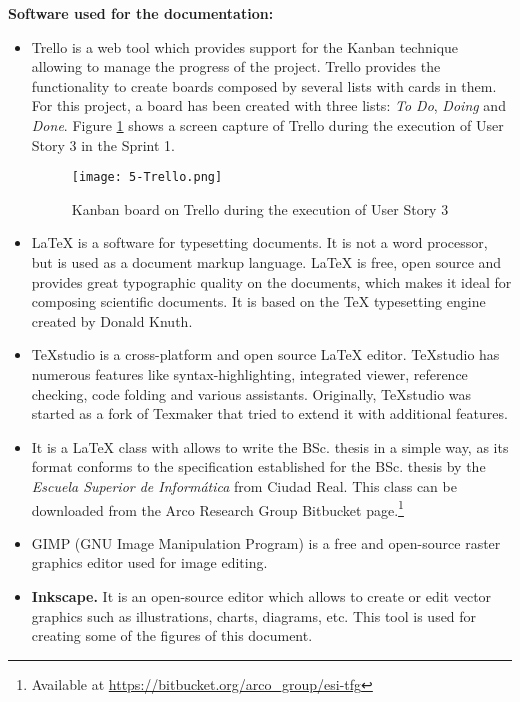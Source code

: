 \textbf{Software used for the documentation:}
\begin{itemize}
	\item {} Trello is a web tool which provides support for the Kanban technique allowing to manage the progress of the project. Trello provides the functionality to create boards composed by several lists with cards in them. For this project, a board has been created with three lists: \emph{To Do}, \emph{Doing} and \emph{Done}. Figure \ref{fig:5-Trello} shows a screen capture of Trello during the execution of User Story 3 in the Sprint 1.
	
	\begin{figure}[!h]
		\begin{center}
			\texttt{[image: 5-Trello.png]}
			\caption{Kanban board on Trello during the execution of User Story 3}
			\label{fig:5-Trello}
		\end{center}
	\end{figure}
	
	\item {} \LaTeX{} is a software for typesetting documents. It is not a word processor, but is used as a document markup language. \LaTeX{} is free, open source and provides great typographic quality on the documents, which makes it ideal for composing scientific documents. It is based on the \TeX{} typesetting engine created by Donald Knuth.
	
	\item {} TeXstudio is a cross-platform and open source \LaTeX{} editor. TeXstudio has numerous features like syntax-highlighting, integrated viewer, reference checking, code folding and various assistants. Originally, TeXstudio was started as a fork of Texmaker that tried to extend it with additional features. 
	
	\item {} It is a \LaTeX{} class with allows to write the \ac{BSc.} thesis in a simple way, as its format conforms to the specification established for the \ac{BSc.} thesis by the \emph{Escuela Superior de Informática} from Ciudad Real. This class can be downloaded from the Arco Research Group Bitbucket page.\footnote{Available at \url{https://bitbucket.org/arco_group/esi-tfg}}
	
	\item {} GIMP (\ac{GNU} Image Manipulation Program) is a free and open-source raster graphics editor used for image editing.
	
	\item \textbf{Inkscape.} It is an open-source editor which allows to create or edit vector graphics such as illustrations, charts, diagrams, etc. This tool is used for creating some of the figures of this document.
	
\end{itemize}

